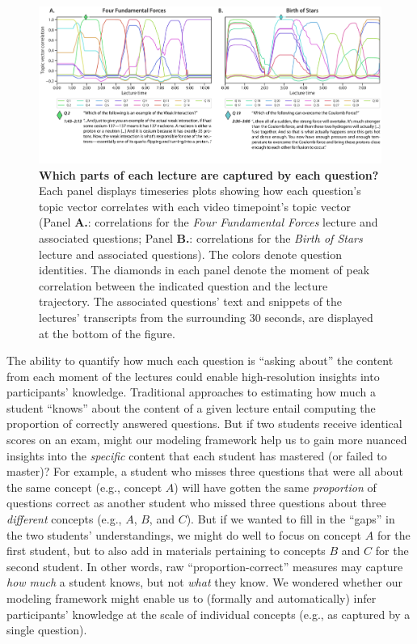 \documentclass[10pt]{article}
\begin{document}
\begin{figure}[tp] \centering
\includegraphics[width=\textwidth]{figs/lecture-question-similarity}

\caption{\textbf{Which parts of each lecture are captured by each question?}
Each panel displays timeseries plots showing how each question's topic vector
correlates with each video timepoint's topic vector (Panel \textbf{A.}:
correlations for the \textit{Four Fundamental Forces} lecture and associated
questions; Panel \textbf{B.}: correlations for the \textit{Birth of Stars}
lecture and associated questions). The colors denote question identities. The
diamonds in each panel denote the moment of peak correlation between the
indicated question and the lecture trajectory. The associated questions' text
and snippets of the lectures' transcripts from the surrounding 30 seconds, are
displayed at the bottom of the figure.}

    \label{fig:question-correlations}
\end{figure}

The ability to quantify how much each question is ``asking about'' the content
from each moment of the lectures could enable high-resolution insights into
participants' knowledge. Traditional approaches to estimating how much a
student ``knows'' about the content of a given lecture entail computing the
proportion of correctly answered questions. But if two students receive
identical scores on an exam, might our modeling framework help us to gain more
nuanced insights into the \textit{specific} content that each student has
mastered (or failed to master)? For example, a student who misses three
questions that were all about the same concept (e.g., concept $A$) will have
gotten the same \textit{proportion} of questions correct as another student who
missed three questions about three \textit{different} concepts (e.g., $A$, $B$,
and $C$). But if we wanted to fill in the ``gaps'' in the two students'
understandings, we might do well to focus on concept $A$ for the first student,
but to also add in materials pertaining to concepts $B$ and $C$ for the second
student. In other words, raw ``proportion-correct'' measures may capture
\textit{how much} a student knows, but not \textit{what} they know. We wondered
whether our modeling framework might enable us to (formally and automatically)
infer participants' knowledge at the scale of individual concepts (e.g., as
captured by a single question).
\end{document}
